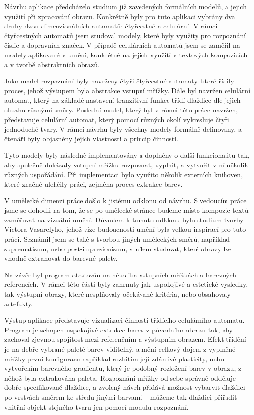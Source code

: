Návrhu aplikace předcházelo studium již zavedených formálních modelů, a jejich využití při zpracování obrazu. Konkrétně byly pro tuto aplikaci vybrány dva druhy dvou-dimenzionálních automatů: čtyřcestné a celulární. V rámci čtyřcestných automatů jsem studoval modely, které byly využity pro rozpoznání číslic a dopravních značek. V případě celulárních automatů jsem se zaměřil na modely aplikované v umění, konkrétně na jejich využití v textových kompozicích a v tvorbě abstraktních obrazů.

Jako model rozpoznání byly navrženy čtyři čtyřcestné automaty, které řídily proces, jehož výstupem byla abstrakce vstupní mřížky. Dále byl navržen celulární automat, který na základě nastavení tranzitivní funkce třídí dlaždice dle jejich obsahu různými směry. Poslední model, který byl v rámci této práce navržen, představuje celulární automat, který pomocí různých okolí vykresluje čtyři jednoduché tvary. V rámci návrhu byly všechny modely formálně definovány, a čtenáři byly objasněny jejich vlastnosti a princip činnosti.

Tyto modely byly následně implementovány a doplněny o další funkcionalitu tak, aby společně dokázaly vstupní mřížku rozpoznat, vyplnit, a vytvořit v ní několik různých uspořádání. Při implementaci bylo využito několik externích knihoven, které značně ulehčily práci, zejména proces extrakce barev. 

V umělecké dimenzi práce došlo k jistému odklonu od návrhu. S vedoucím práce jsme se dohodli na tom, že se po umělecké stránce budeme místo kompozic textů zaměřovat na vizuální umění. Důvodem k tomuto odklonu bylo studium tvorby Victora Vasarelyho, jehož vize budoucnosti umění byla velkou inspirací pro tuto práci. Seznámil jsem se také s tvorbou jiných uměleckých směrů, například suprematismu, nebo post-impresionismu, s~cílem studovat, které obrazy lze vhodně extrahovat do barevné palety.

Na závěr byl program otestován na několika vstupních mřížkách a barevných referencích. V rámci této části byly zahrnuty jak uspokojivé a estetické výsledky, tak výstupní obrazy, které nesplňovaly očekávané kritéria, nebo obsahovaly artefakty.

Výstup aplikace představuje vizualizaci činnosti třídícího celulárního automatu. Program je schopen uspokojivé extrakce barev z původního obrazu tak, aby zachoval zjevnou spojitost mezi referenčním a výstupním obrazem. Efekt třídění je na dobře vybrané paletě barev viditelný, a mění celkový dojem z vyplněné mřížky první konfigurace například rozbitím její zdánlivé plasticity, nebo vytvořením barevného gradientu, který je podobný rozložení barev v obrazu, z něhož byla extrahována paleta. Rozpoznání mřížky od sebe správně odděluje dobře specifikované dlaždice, a zvolený návrh přidává možnost vybarvit dlaždici po vrstvách směrem ke středu jinými barvami -- můžeme tak dlaždici přiřadit vnitřní objekt stejného tvaru jen pomocí modulu rozpoznání. 


